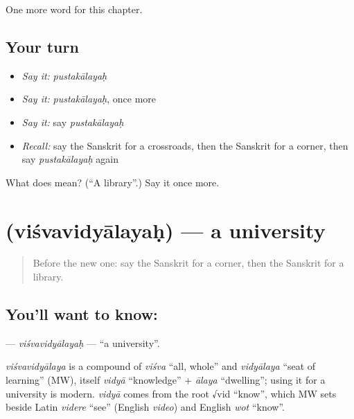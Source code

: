 \begin{grammarlens}[title={What you've built}]
One more word for this chapter.
\end{grammarlens}

\subsection*{Your turn}
\begin{itemize}
\raggedright
  \item \emph{Say it:} \emph{pustakālayaḥ}
  \item \emph{Say it:} \emph{pustakālayaḥ}, once more
  \item \emph{Say it:} say \emph{pustakālayaḥ}
  \item \emph{Recall:} say the Sanskrit for a crossroads, then the Sanskrit for a corner, then say \emph{pustakālayaḥ} again
\end{itemize}

\begin{tcolorbox}[breakable,colback=teal!4,colframe=teal!35!black,title={Before you move on}]
What does  mean? (\textquotedblleft{}A library\textquotedblright{}.) Say it once more.
\end{tcolorbox}
\section[\texorpdfstring{\sk{विश्वविद्यालयः} (viśvavidyālayaḥ)}{विश्वविद्यालयः (viśvavidyālayaḥ)}]{ (viśvavidyālayaḥ) — a university}

\label{lesson:SA-C96-visvavidyalayah}



\begin{quote}
Before the new one: say the Sanskrit for a corner, then the Sanskrit for a library.
\end{quote}

\subsection*{You'll want to know: }
\textbf{} — \emph{viśvavidyālayaḥ} — \textquotedblleft{}a university\textquotedblright{}.

\begin{cousinweb}
\emph{viśvavidyālaya} is a compound of \emph{viśva} \textquotedblleft{}all, whole\textquotedblright{} and \emph{vidyālaya} \textquotedblleft{}seat of learning\textquotedblright{} (MW), itself \emph{vidyā} \textquotedblleft{}knowledge\textquotedblright{} + \emph{ālaya} \textquotedblleft{}dwelling\textquotedblright{}; using it for a university is modern. \emph{vidyā} comes from the root √vid \textquotedblleft{}know\textquotedblright{}, which MW sets beside Latin \emph{videre} \textquotedblleft{}see\textquotedblright{} (English \emph{video}) and English \emph{wot} \textquotedblleft{}know\textquotedblright{}.
\end{cousinweb}

